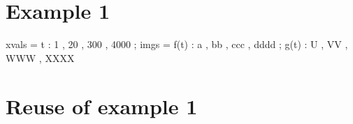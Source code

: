 \documentclass[12pt]{article}
\begin{document}
\section{Example 1}

\begin{functable}
    xvals =    t : 1 , 20 , 300 , 4000 ;
    imgs  = f(t) : a , bb , ccc , dddd ;
            g(t) : U , VV , WWW , XXXX
\end{functable}


\section{Reuse of example 1}

\begin{functable}[1]
\end{functable}
\end{document}
